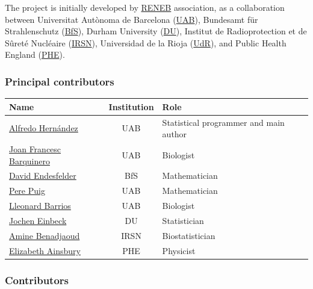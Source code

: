 \documentclass[]{scrartcl}
\begin{document}
The project is initially developed by \href{http://www.reneb.net}{RENEB} association, as a collaboration between Universitat Autònoma de Barcelona (\href{https://www.uab.cat/}{UAB}), Bundesamt für Strahlenschutz (\href{http://www.bfs.de/EN/home/home_node.html}{BfS}), Durham University (\href{https://www.dur.ac.uk/}{DU}), Institut de Radioprotection et de Sûreté Nucléaire (\href{https://www.irsn.fr/EN/Pages/Home.aspx}{IRSN}), Universidad de la Rioja (\href{https://www.unirioja.es/}{UdR}), and Public Health England (\href{https://www.phe-protectionservices.org.uk/}{PHE}).

\hypertarget{principal-contributors}{%
\subsubsection*{Principal contributors}\label{principal-contributors}}

\begin{longtable}[]{@{}lcl@{}}
\toprule
Name & Institution & Role\tabularnewline
\midrule
\endhead
\href{http://aldomann.com}{Alfredo Hernández} & UAB & Statistical programmer and main author\tabularnewline
\href{https://orcid.org/0000-0003-0084-5268}{Joan Francesc Barquinero} & UAB & Biologist\tabularnewline
\href{https://www.researchgate.net/profile/David_Endesfelder2}{David Endesfelder} & BfS & Mathematician\tabularnewline
\href{http://grupsderecerca.uab.cat/advancedstochasticmodelling/content/pere-puig}{Pere Puig} & UAB & Mathematician\tabularnewline
\href{https://orcid.org/0000-0002-6151-8503}{Lleonard Barrios} & UAB & Biologist\tabularnewline
\href{https://orcid.org/0000-0002-9457-2020}{Jochen Einbeck} & DU & Statistician\tabularnewline
\href{https://www.researchgate.net/profile/Mohamed_Benadjaoud}{Amine Benadjaoud} & IRSN & Biostatistician\tabularnewline
\href{https://www.phe-protectionservices.org.uk/cds/team/liz_ainsbury}{Elizabeth Ainsbury} & PHE & Physicist\tabularnewline
\bottomrule
\end{longtable}

\hypertarget{contributors}{%
\subsubsection*{Contributors}\label{contributors}}
\end{document}
